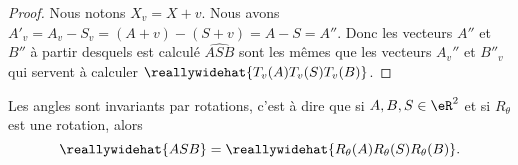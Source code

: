 \begin{proof}
    Nous notons \( X_v=X+v\). Nous avons \( A'_v=A_v-S_v=(A+v)-(S+v)=A-S=A''\). Donc les vecteurs \( A''\) et \( B''\) à partir desquels est calculé \( \widehat{ASB}\) sont les mêmes que les vecteurs \(  A_v'' \) et \( B''_v\) qui servent à calculer \( \reallywidehat{T_v(A)T_v(S)T_v(B)}\).
\end{proof}

\begin{proposition}      \label{PROPooYWKJooRjybUJ}
    Les angles sont invariants par rotations, c'est à dire que si \( A,B,S\in \eR^2\) et si \( R_{\theta}\) est une rotation, alors
    \begin{equation}
        \reallywidehat{ASB}=\reallywidehat{R_{\theta}(A)R_{\theta}(S)R_{\theta}(B)}.
    \end{equation}
\end{proposition}

